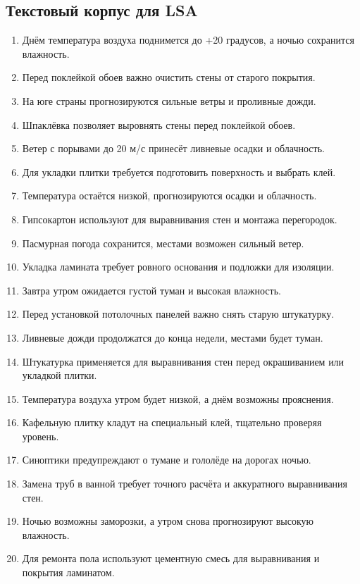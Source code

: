 \subsection*{Текстовый корпус для LSA}
\begin{enumerate}
  \item Днём температура воздуха поднимется до +20 градусов, а ночью сохранится влажность.
  \item Перед поклейкой обоев важно очистить стены от старого покрытия.
  \item На юге страны прогнозируются сильные ветры и проливные дожди.
  \item Шпаклёвка позволяет выровнять стены перед поклейкой обоев.
  \item Ветер с порывами до 20 м/с принесёт ливневые осадки и облачность.
  \item Для укладки плитки требуется подготовить поверхность и выбрать клей.
  \item Температура остаётся низкой, прогнозируются осадки и облачность.
  \item Гипсокартон используют для выравнивания стен и монтажа перегородок.
  \item Пасмурная погода сохранится, местами возможен сильный ветер.
  \item Укладка ламината требует ровного основания и подложки для изоляции.
  \item Завтра утром ожидается густой туман и высокая влажность.
  \item Перед установкой потолочных панелей важно снять старую штукатурку.
  \item Ливневые дожди продолжатся до конца недели, местами будет туман.
  \item Штукатурка применяется для выравнивания стен перед окрашиванием или укладкой плитки.
  \item Температура воздуха утром будет низкой, а днём возможны прояснения.
  \item Кафельную плитку кладут на специальный клей, тщательно проверяя уровень.
  \item Синоптики предупреждают о тумане и гололёде на дорогах ночью.
  \item Замена труб в ванной требует точного расчёта и аккуратного выравнивания стен.
  \item Ночью возможны заморозки, а утром снова прогнозируют высокую влажность.
  \item Для ремонта пола используют цементную смесь для выравнивания и покрытия ламинатом.
\end{enumerate}

